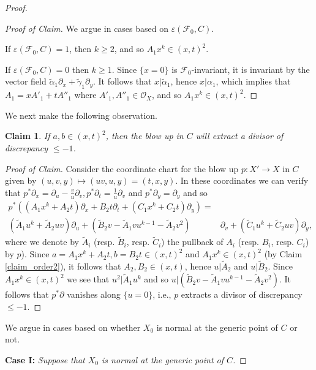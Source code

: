 \documentclass[10pt,a4paper]{amsart}
\newtheorem{claim}[theorem]{Claim}
\begin{document}
\begin{proof}
\begin{proof}[Proof of Claim]
We argue in cases based on $\varepsilon(\mathcal F_0, C)$.

If $\varepsilon(\mathcal F_0, C) = 1$, then $k \ge 2$, and so $A_1x^k \in (x, t)^2$.  

If $\varepsilon(\mathcal F_0, C) = 0$ then $k \ge 1$.   Since $\{x = 0\}$ is $\mathcal F_0$-invariant, it is invariant by the vector field 
$\tilde{\alpha}_1\partial_x+\tilde{\gamma}_1\partial_y$.  It follows that $x|\tilde{\alpha}_1$, hence $x|\alpha_1$, which implies that $A_1 = xA'_1+tA''_1$ where $A'_1, A''_1 \in \mathcal O_X$, and so $A_1x^k \in (x, t)^2$.
\end{proof}

We next make the following observation.

\begin{claim}
\label{claim_easy_discrep_calc}
    If
$a, b\in (x, t)^2$, 
then the blow up in $C$ will extract a divisor of discrepancy $\leq -1$.
\end{claim}
\begin{proof}[Proof of Claim]
Consider the coordinate chart for the blow up $p\colon X' \rightarrow X$ in $C$ 
given by $(u, v, y) \mapsto (uv, u, y) = (t, x, y)$.
In these coordinates we can verify that 
$p^*\partial_x = \partial_u - \frac{v}{u}\partial_v, p^*\partial_t = \frac{1}{u}\partial_v$ and $p^*\partial_y = \partial_y$ and so 
\begin{align*}p^*((A_1x^k+A_2t)\partial_x+B_2t\partial_t+(C_1x^k+C_2t)\partial_y) =& \\
(\tilde A_1u^k+\tilde A_2uv)\partial_u +(\tilde B_2v-\tilde A_1vu^{k-1}-\tilde A_2v^2)&\partial_v+(\tilde C_1u^k+\tilde C_2uv)\partial_y,
\end{align*}
where we denote by $\tilde{A}_i$ (resp. $\tilde{B}_i$, resp. $\tilde{C}_i$) the pullback of $A_i$ (resp. $B_i$, resp. $C_i$)
by $p$).
Since $a = A_1x^k+A_2t, b = B_2t \in (x, t)^2$ and $A_1x^k \in (x, t)^2$ (by Claim \ref{claim_order2}), it follows that
$A_2, B_2 \in (x, t)$, hence $u|\tilde A_2$ and 
$u|\tilde B_2$. Since $A_1x^k \in (x, t)^2$ we see that $u^2|\tilde A_1u^k$ and so $u| (\tilde B_2v-\tilde A_1vu^{k-1}-\tilde A_2v^2)$.  It follows that $p^*\partial$ vanishes along $\{u = 0\}$, i.e., $p$ extracts a divisor of discrepancy $\le-1$.
\end{proof}

We argue in cases based on whether $X_0$ is normal at the generic point of $C$ or not.

{\bf Case I: }{\it  Suppose that $X_0$ is normal at the generic point of $C$.}


\end{proof}
\end{document}
